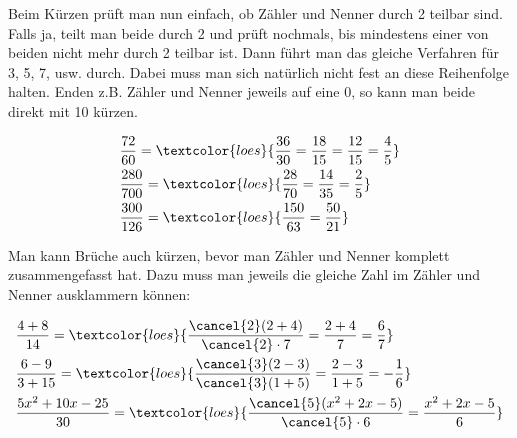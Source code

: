 Beim Kürzen prüft man nun einfach, ob Zähler und Nenner durch 2 teilbar sind. Falls ja, teilt man beide durch 2 und prüft nochmals, bis mindestens einer von beiden nicht mehr durch 2 teilbar ist. Dann führt man das gleiche Verfahren für 3, 5, 7, usw. durch. Dabei muss man sich natürlich nicht fest an diese Reihenfolge halten. Enden z.B. Zähler und Nenner jeweils auf eine 0, so kann man beide direkt mit 10 kürzen.
\begin{bsp}
	\begin{align*}
		&\frac{72}{60}=\textcolor{loes}{\frac{36}{30}=\frac{18}{15}=\frac{12}{15}=\frac{4}{5}}\\
		&\frac{280}{700}=\textcolor{loes}{\frac{28}{70}=\frac{14}{35}=\frac{2}{5}}\\
		&\frac{300}{126}=\textcolor{loes}{\frac{150}{63}=\frac{50}{21}}
	\end{align*}
\end{bsp}
Man kann Brüche auch kürzen, bevor man Zähler und Nenner komplett zusammengefasst hat. Dazu muss man jeweils die gleiche Zahl im Zähler und Nenner ausklammern können:
\begin{bsp}
	\begin{align*}
		&\frac{4+8}{14}=\textcolor{loes}{\frac{\cancel{2}(2+4)}{\cancel{2}\cdot 7}=\frac{2+4}{7}=\frac{6}{7}}\\
		&\frac{6-9}{3+15}=\textcolor{loes}{\frac{\cancel{3}(2-3)}{\cancel{3}(1+5)}=\frac{2-3}{1+5}=-\frac{1}{6}}\\
		&\frac{5x^2+10x-25}{30}=\textcolor{loes}{\frac{\cancel{5}(x^2+2x-5)}{\cancel{5}\cdot 6}=\frac{x^2+2x-5}{6}}
	\end{align*}
\end{bsp}
\newpage
